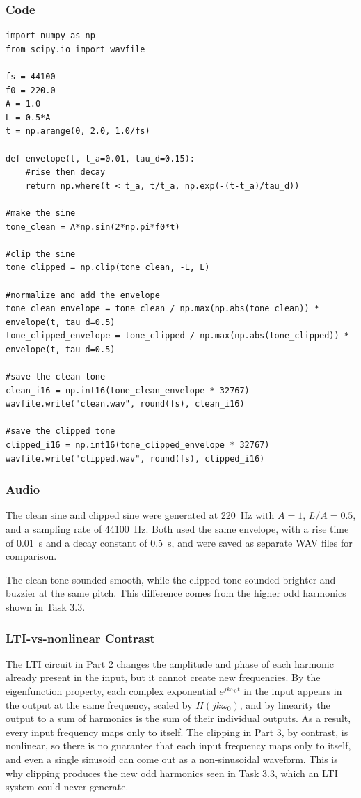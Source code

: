 \documentclass[11pt, a4paper]{article}
\begin{document}
\subsubsection*{Code}
\begin{lstlisting}
import numpy as np
from scipy.io import wavfile

fs = 44100
f0 = 220.0
A = 1.0
L = 0.5*A
t = np.arange(0, 2.0, 1.0/fs)

def envelope(t, t_a=0.01, tau_d=0.15):
    #rise then decay
    return np.where(t < t_a, t/t_a, np.exp(-(t-t_a)/tau_d))

#make the sine
tone_clean = A*np.sin(2*np.pi*f0*t)

#clip the sine
tone_clipped = np.clip(tone_clean, -L, L)

#normalize and add the envelope
tone_clean_envelope = tone_clean / np.max(np.abs(tone_clean)) * envelope(t, tau_d=0.5)
tone_clipped_envelope = tone_clipped / np.max(np.abs(tone_clipped)) * envelope(t, tau_d=0.5)

#save the clean tone
clean_i16 = np.int16(tone_clean_envelope * 32767)
wavfile.write("clean.wav", round(fs), clean_i16)

#save the clipped tone
clipped_i16 = np.int16(tone_clipped_envelope * 32767)
wavfile.write("clipped.wav", round(fs), clipped_i16)   
\end{lstlisting}
\subsubsection*{Audio}

The clean sine and clipped sine were generated at \SI{220}{\hertz} with $A=1$, $L/A=0.5$, and a sampling rate of \SI{44100}{\hertz}. Both used the same envelope, with a rise time of \SI{0.01}{\second} and a decay constant of \SI{0.5}{\second}, and were saved as separate WAV files for comparison.

The clean tone sounded smooth, while the clipped tone sounded brighter and buzzier at the same pitch. This difference comes from the higher odd harmonics shown in Task 3.3.

\subsubsection*{LTI-vs-nonlinear Contrast}

The LTI circuit in Part 2 changes the amplitude and phase of each harmonic already present in the input, but it cannot create new frequencies. By the eigenfunction property, each complex exponential $e^{jk\omega_0 t}$ in the input appears in the output at the same frequency, scaled by $H(jk\omega_0)$, and by linearity the output to a sum of harmonics is the sum of their individual outputs. As a result, every input frequency maps only to itself. The clipping in Part 3, by contrast, is nonlinear, so there is no guarantee that each input frequency maps only to itself, and even a single sinusoid can come out as a non-sinusoidal waveform. This is why clipping produces the new odd harmonics seen in Task 3.3, which an LTI system could never generate.
\end{document}

